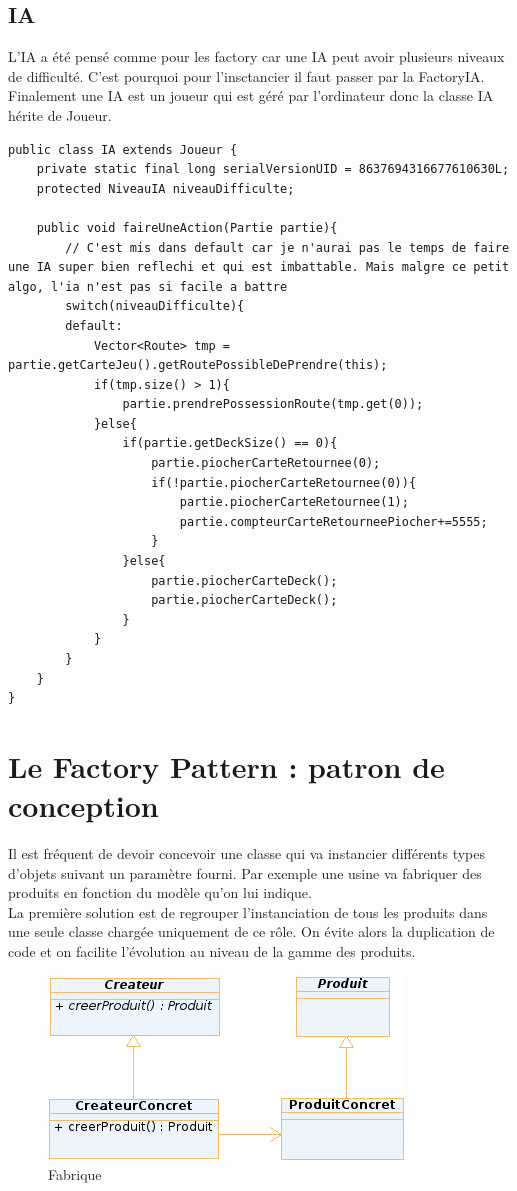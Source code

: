 \documentclass{report}
\begin{document}
\subsection{IA} \label{defIA}
L'IA a été pensé comme pour les factory car une IA peut avoir plusieurs niveaux de difficulté. C'est pourquoi pour l'insctancier il faut passer par la FactoryIA.\\
Finalement une IA est un joueur qui est géré par l'ordinateur donc la classe IA hérite de  Joueur.
\begin{lstlisting}[caption=La classe IA]
public class IA extends Joueur {
	private static final long serialVersionUID = 8637694316677610630L;
	protected NiveauIA niveauDifficulte;
	
	public void faireUneAction(Partie partie){
		// C'est mis dans default car je n'aurai pas le temps de faire une IA super bien reflechi et qui est imbattable. Mais malgre ce petit algo, l'ia n'est pas si facile a battre
		switch(niveauDifficulte){
		default:
			Vector<Route> tmp = partie.getCarteJeu().getRoutePossibleDePrendre(this);
			if(tmp.size() > 1){
				partie.prendrePossessionRoute(tmp.get(0));
			}else{
				if(partie.getDeckSize() == 0){
					partie.piocherCarteRetournee(0);
					if(!partie.piocherCarteRetournee(0)){
						partie.piocherCarteRetournee(1);
						partie.compteurCarteRetourneePiocher+=5555;
					}
				}else{
					partie.piocherCarteDeck();
					partie.piocherCarteDeck();
				}
			}
		}
	}
}
\end{lstlisting}

\newpage
\section{Le Factory Pattern : patron de conception}
Il est fréquent de devoir concevoir une classe qui va instancier différents types d'objets suivant un paramètre fourni. Par exemple une usine va fabriquer des produits en fonction du modèle qu'on lui indique.\\
La première solution est de regrouper l'instanciation de tous les produits dans une seule classe chargée uniquement de ce rôle. On évite alors la duplication de code et on facilite l'évolution au niveau de la gamme des produits.
\begin{figure}[H]
\center
\includegraphics{fabrique.png}
\caption{Fabrique}
\label{fabrique}
\end{figure}
\end{document}
